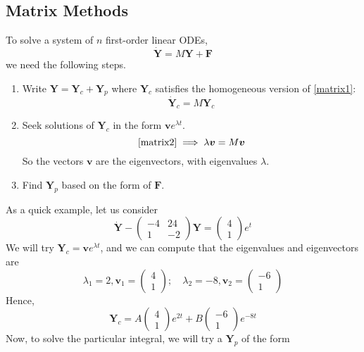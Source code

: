 \documentclass{article}
\begin{document}
\subsection{Matrix Methods}
To solve a system of $n$ first-order linear ODEs,
\begin{equation}\label{matrix1}
	\dot {\bm Y} = M\bm Y + \bm F
\end{equation}
we need the following steps.
\begin{enumerate}
	\item Write $\bm Y = \bm Y_c + \bm Y_p$ where $\bm Y_c$ satisfies the homogeneous version of \eqref{matrix1}:
	      \begin{equation}\label{matrix2}
		      \dot {\bm Y}_c = M\bm Y_c
	      \end{equation}
	\item Seek solutions of $\bm Y_c$ in the form $\bm v e^{\lambda t}$.
	      \[ \eqref{matrix2} \implies \lambda \bm v = M\bm v \]
	      So the vectors $\bm v$ are the eigenvectors, with eigenvalues $\lambda$.
	\item Find $\bm Y_p$ based on the form of $\bm F$.
\end{enumerate}
As a quick example, let us consider
\begin{equation}\label{matrixexample}
	\dot {\bm Y} - \begin{pmatrix}
		-4 & 24 \\ 1 & -2
	\end{pmatrix}\bm Y = \begin{pmatrix}
		4 \\ 1
	\end{pmatrix}e^t
\end{equation}
We will try $\bm Y_c = \bm v e^{\lambda t}$, and we can compute that the eigenvalues and eigenvectors are
\[ \lambda_1 = 2, \bm v_1 = \begin{pmatrix}
		4 \\ 1
	\end{pmatrix};\quad \lambda_2 = -8, \bm v_2 = \begin{pmatrix}
		-6 \\ 1
	\end{pmatrix} \]
Hence,
\[ \bm Y_c = A\begin{pmatrix}
		4 \\ 1
	\end{pmatrix}e^{2t} + B\begin{pmatrix}
		-6 \\ 1
	\end{pmatrix}e^{-8t} \]
Now, to solve the particular integral, we will try a $\bm Y_p$ of the form
\end{document}
